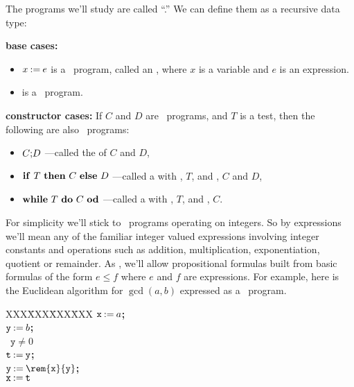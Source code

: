 The programs we'll study are called ``.''  We
can define them as a recursive data type:
\begin{definition}\label{whiledef} \mbox{}

\textbf{base cases:}
\begin{itemize}

\item $x \mathbin{\mathtt{:=}} e$ is a \while\ program, called an , where $x$ is a variable and $e$ is an expression.

\item \term{$\halt$} is a \while\ program.

\end{itemize}

\textbf{constructor cases:}
If $C$ and $D$ are \while\ programs, and $T$ is a test, then the following are also
\while\ programs:
\begin{itemize}

\item $C\mathbf{;}D$
---called the  of $C$ and $D$,

\item $\text{\textbf{if}}\ T\ \text{\textbf{then}}\ C\ \text{\textbf{else}}\ D$ ---called a  with
  , $T$, and , $C$ and $D$,

\item $\text{\textbf{while}}\ T\ \text{\textbf{do}}\ C\ \text{\textbf{od}}$
---called a  with , $T$, and , $C$.

\end{itemize}
\end{definition}

For simplicity we'll stick to \while\ programs operating on integers.  So by
expressions we'll mean any of the familiar integer valued
expressions involving integer constants and operations such as addition,
multiplication, exponentiation, quotient or remainder.  As ,
we'll allow propositional formulas built from basic formulas of the form
$e \leq f$ where $e$ and $f$ are expressions.  For example, here is the
Euclidean algorithm for $\gcd(a,b)$ expressed as a \while\ program.
\begin{tabbing}
XXX\=XXX\=XXX\=XXX\kill
$\mathtt{x} \mathbin{\mathtt{:=}} a$\textbf{;} \\
$\mathtt{y} \mathbin{\mathtt{:=}} b$\textbf{;} \\
\while\ $\mathtt{y} \neq 0$ \docomm\\
   \> $\mathtt{t} \mathbin{\mathtt{:=}} \mathtt{y}$\textbf{;}\\
   \> $\mathtt{y} \assigned \rem{\mathtt{x}}{\mathtt{y}}$\textbf{;}\\
   \> $\mathtt{x} \mathbin{\mathtt{:=}} \mathtt{t}$
\odcomm\\
\end{tabbing}

